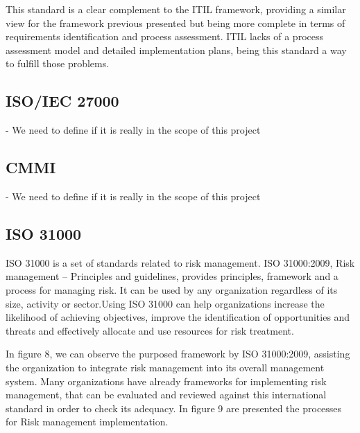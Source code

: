 \begin{itemize}
  This standard is a clear complement to the ITIL framework, providing a similar view for the framework previous presented but being more complete in terms of requirements identification and process assessment. ITIL lacks of a process assessment model and detailed implementation plans, being this standard a way to fulfill those problems.\par
  
\end{itemize}

\subsection{ISO/IEC 27000} - We need to define if it is really in the scope of this project

\subsection{CMMI} - We need to define if it is really in the scope of this project

\subsection{ISO 31000}

ISO 31000 is a set of standards related to risk management. ISO 31000:2009, Risk management – Principles and guidelines, provides principles, framework and a process for managing risk. It can be used by any organization regardless of its size, activity or sector.Using ISO 31000 can help organizations increase the likelihood of achieving objectives, improve the identification of opportunities and threats and effectively allocate and use resources for risk treatment.\par
In figure 8, we can observe the purposed framework by ISO 31000:2009, assisting the organization to integrate risk management into its overall management system. Many organizations have already frameworks for implementing risk management, that can be evaluated and reviewed against this international standard in order to check its adequacy. In figure 9 are presented the processes for Risk management implementation.\par

